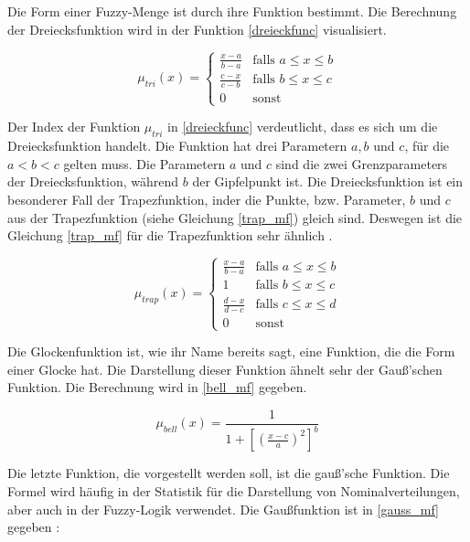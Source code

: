 Die Form einer Fuzzy-Menge ist durch ihre Funktion bestimmt. Die Berechnung der Dreiecksfunktion wird in der Funktion \ref{dreieckfunc} visualisiert.

\begin{equation}
\mu_{tri}(x) = \begin{cases}
\frac{x - a}{b - a} & \text{falls $a \leq x \leq b$}\\
\frac{c - x}{c - b} & \text{falls $b \leq x \leq c$}\\
0 & \text{sonst}
\end{cases}\label{dreieckfunc}
\end{equation}

Der Index der Funktion $\mu_{tri}$ in \ref{dreieckfunc} verdeutlicht, dass es sich um die Dreiecksfunktion handelt. Die Funktion hat drei Parametern $a, b$ und $c$, für die $a < b < c$ gelten muss. Die Parametern $a$ und $c$ sind die zwei Grenzparameters der Dreiecksfunktion, während $b$ der Gipfelpunkt ist. Die Dreiecksfunktion ist ein besonderer Fall der Trapezfunktion, inder die Punkte, bzw. Parameter, $b$ und $c$ aus der Trapezfunktion (siehe Gleichung \ref{trap_mf}) gleich sind. Deswegen ist die Gleichung \ref{trap_mf} für die Trapezfunktion sehr ähnlich \cite{CIKruse:15}.

\begin{equation}
\mu_{trap}(x) = \begin{cases}
\frac{x - a}{b - a} & \text{falls $a \leq x \leq b$}\\
1 & \text{falls $b \leq x \leq c$}\\
\frac{d - x}{d - c} & \text{falls $c \leq x \leq d$}\\
0 & \text{sonst}

\label{trap_mf}
\end{cases}
\end{equation}

Die Glockenfunktion ist, wie ihr Name bereits sagt, eine Funktion, die die Form einer Glocke hat. Die Darstellung dieser Funktion ähnelt sehr der Gauß'schen Funktion. Die Berechnung wird in \ref{bell_mf} gegeben. 

\begin{equation}
\mu_{bell}(x) = \frac{1}{1 + [(\frac{x - c}{a})^2]^b}
\label{bell_mf}
\end{equation}

Die letzte Funktion, die vorgestellt werden soll, ist die gauß'sche Funktion. Die Formel wird häufig in der Statistik für die Darstellung von Nominalverteilungen, aber auch in der Fuzzy-Logik verwendet. Die Gaußfunktion ist in \ref{gauss_mf} gegeben \cite{CIKruse:15}:

